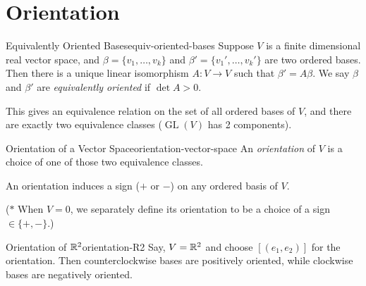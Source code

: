
\section{Orientation}

\begin{definition}{Equivalently Oriented Bases}{equiv-oriented-bases}
    Suppose $V$ is a finite dimensional real vector space, and $\beta = \{v_1, \ldots, v_k\}$ and $\beta' = \{v_1', \ldots, v_k'\}$ are two ordered bases. Then there is a unique linear isomorphism $A \colon V \to V$ such that $\beta' = A\beta$. We say $\beta$ and $\beta'$ are \emph{equivalently oriented} if $\det A > 0$.
\end{definition}

This gives an equivalence relation on the set of all ordered bases of $V$, and there are exactly two equivalence classes ($\operatorname{GL}(V)$ has 2 components).

\begin{definition}{Orientation of a Vector Space}{orientation-vector-space}
    An \emph{orientation} of $V$ is a choice of one of those two equivalence classes.
\end{definition}

An orientation induces a sign ($+$ or $-$) on any ordered basis of $V$.

($*$ When $V = 0$, we separately define its orientation to be a choice of a sign $\in \{+, -\}$.)

\begin{example}{Orientation of $\mathbb{R}^2$}{orientation-R2}
    Say, $V = \mathbb{R}^2$ and choose $[(e_1, e_2)]$ for the orientation. Then counterclockwise bases are positively oriented, while clockwise bases are negatively oriented.
\end{example}


